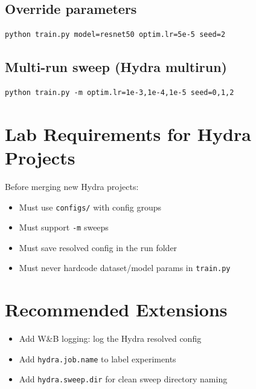 \documentclass[11pt]{article}
\begin{document}
\subsection{Override parameters}
\begin{lstlisting}
python train.py model=resnet50 optim.lr=5e-5 seed=2
\end{lstlisting}

\subsection{Multi-run sweep (Hydra multirun)}
\begin{lstlisting}
python train.py -m optim.lr=1e-3,1e-4,1e-5 seed=0,1,2
\end{lstlisting}

\section{Lab Requirements for Hydra Projects}
Before merging new Hydra projects:
\begin{itemize}
    \item Must use \texttt{configs/} with config groups
    \item Must support \texttt{-m} sweeps
    \item Must save resolved config in the run folder
    \item Must never hardcode dataset/model params in \texttt{train.py}
\end{itemize}

\section{Recommended Extensions}
\begin{itemize}
    \item Add W\&B logging: log the Hydra resolved config
    \item Add \texttt{hydra.job.name} to label experiments
    \item Add \texttt{hydra.sweep.dir} for clean sweep directory naming
\end{itemize}
\end{document}
